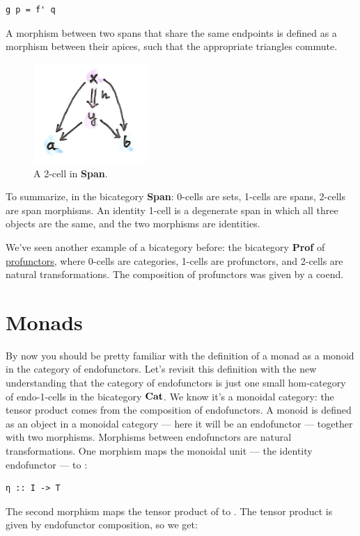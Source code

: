 \begin{Verbatim}[commandchars=\\\{\}]
g p = f' q
\end{Verbatim}
A morphism between two spans that share the same endpoints is defined as
a morphism  between their apices, such that the appropriate
triangles commute.

\begin{figure}[H]
\centering
\includegraphics[width=1.70833in]{images/morphspan.png}
\caption{A 2-cell in \textbf{Span}.}
\end{figure}

\noindent
To summarize, in the bicategory \textbf{Span}: 0-cells are sets, 1-cells
are spans, 2-cells are span morphisms. An identity 1-cell is a
degenerate span in which all three objects are the same, and the two
morphisms are identities.

We've seen another example of a bicategory before: the bicategory
\textbf{Prof} of
\hyperref[ends-and-coends]{profunctors},
where 0-cells are categories, 1-cells are profunctors, and 2-cells are
natural transformations. The composition of profunctors was given by a
coend.

\section{Monads}\label{monads}

By now you should be pretty familiar with the definition of a monad as a
monoid in the category of endofunctors. Let's revisit this definition
with the new understanding that the category of endofunctors is just one
small hom-category of endo-1-cells in the bicategory $\mathbf{Cat}$. We
know it's a monoidal category: the tensor product comes from the
composition of endofunctors. A monoid is defined as an object in a
monoidal category --- here it will be an endofunctor  ---
together with two morphisms. Morphisms between endofunctors are natural
transformations. One morphism maps the monoidal unit --- the identity
endofunctor --- to :

\begin{Verbatim}[commandchars=\\\{\}]
η :: I -> T
\end{Verbatim}
The second morphism maps the tensor product of  to
. The tensor product is given by endofunctor composition, so
we get:

